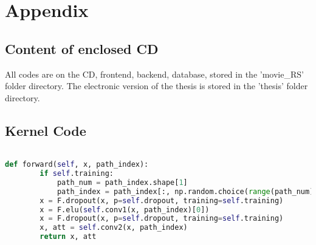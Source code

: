 
\section{Appendix}
\label{ch:appendix}

\subsection{Content of enclosed CD}
All codes are on the CD, frontend, backend, database, stored in the 'movie\_RS' folder directory. The electronic version of the thesis is stored in the 'thesis' folder directory.
\subsection{Kernel Code}

\lstset{style=mystyle}


\begin{lstlisting}[language=Python, caption=generate\_path]

def forward(self, x, path_index):
        if self.training:
            path_num = path_index.shape[1]
            path_index = path_index[:, np.random.choice(range(path_num), int(path_num * (1 - self.path_dropout)))]
        x = F.dropout(x, p=self.dropout, training=self.training)
        x = F.elu(self.conv1(x, path_index)[0])
        x = F.dropout(x, p=self.dropout, training=self.training)
        x, att = self.conv2(x, path_index)
        return x, att

\end{lstlisting}

